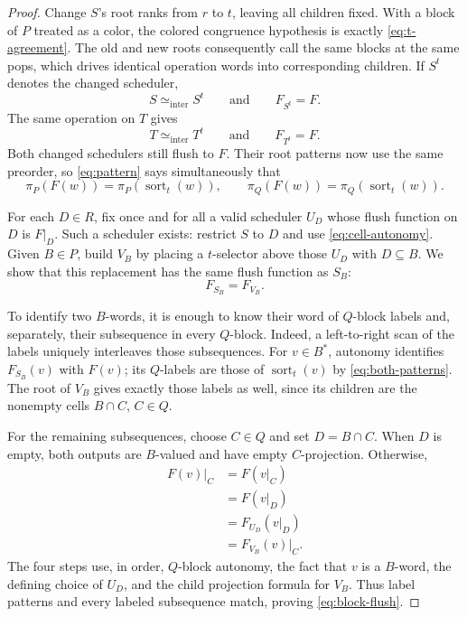\documentclass[11pt]{article}
\theoremstyle{definition}
\newcommand{\sort}{\operatorname{sort}}
\newcommand{\intereq}{\simeq_{\mathrm{inter}}}
\begin{document}
\begin{proof}
Change \(S\)'s root ranks from \(r\) to \(t\), leaving all children fixed.
With a block of \(P\) treated as a color, the colored congruence hypothesis
is exactly \eqref{eq:t-agreement}.  The old and new roots consequently call
the same blocks at the same pops, which drives identical operation words
into corresponding children.  If \(S^t\) denotes the changed scheduler,
\[
  S\intereq S^t
  \qquad\text{and}\qquad
  F_{S^t}=F.
\]
The same operation on \(T\) gives
\[
  T\intereq T^t
  \qquad\text{and}\qquad
  F_{T^t}=F.
\]
Both changed schedulers still flush to \(F\).  Their root patterns now use
the same preorder, so \eqref{eq:pattern} says simultaneously that
\begin{equation}
  \pi_P(F(w))=\pi_P(\sort_t(w)),
  \qquad
  \pi_Q(F(w))=\pi_Q(\sort_t(w)).
  \tag{14}\label{eq:both-patterns}
\end{equation}

For each \(D\in R\), fix once and for all a valid scheduler \(U_D\) whose
flush function on \(D\) is \(F|_D\).  Such a scheduler exists: restrict
\(S\) to \(D\) and use \eqref{eq:cell-autonomy}.  Given \(B\in P\), build
\(V_B\) by placing a \(t\)-selector above those \(U_D\) with \(D\subseteq
B\).  We show that this replacement has the same flush function as \(S_B\):
\begin{equation}
  F_{S_B}=F_{V_B}.
  \tag{15}\label{eq:block-flush}
\end{equation}

To identify two \(B\)-words, it is enough to know their word of
\(Q\)-block labels and, separately, their subsequence in every \(Q\)-block.
Indeed, a left-to-right scan of the labels uniquely interleaves those
subsequences.  For \(v\in B^*\), autonomy identifies \(F_{S_B}(v)\) with
\(F(v)\); its \(Q\)-labels are those of \(\sort_t(v)\) by
\eqref{eq:both-patterns}.  The root of \(V_B\) gives exactly those labels as
well, since its children are the nonempty cells \(B\cap C\), \(C\in Q\).

For the remaining subsequences, choose \(C\in Q\) and set \(D=B\cap C\).
When \(D\) is empty, both outputs are \(B\)-valued and have empty
\(C\)-projection.  Otherwise,
\begin{equation}
\begin{aligned}
 F(v)|_C
 &=F(v|_C)\\
 &=F(v|_D)\\
 &=F_{U_D}(v|_D)\\
 &=F_{V_B}(v)|_C.
\end{aligned}
\tag{16}\label{eq:reconstruction}
\end{equation}
The four steps use, in order, \(Q\)-block autonomy, the fact that \(v\) is a
\(B\)-word, the defining choice of \(U_D\), and the child projection formula
for \(V_B\).  Thus label patterns and every labeled subsequence match,
proving \eqref{eq:block-flush}.


\end{proof}
\end{document}
